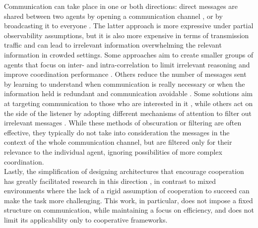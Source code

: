 \documentclass[a4paper,singleside,12pt]{report} %
\begin{document}
Communication can take place in one or both directions: direct messages are shared between two agents by opening a communication channel \cite{Niu2021MultiAgentGC, Zhao2022TargetedMC}, or by broadcasting it to everyone \cite{Kim2021CommunicationIM, Lin2021LearningTG, Sukhbaatar2016LearningMC, Das2018TarMACTM}. The latter approach is more expressive under partial observability assumptions, but it is also more expensive in terms of transmission traffic and can lead to irrelevant information overwhelming the relevant information in crowded settings. Some approaches aim to create smaller groups of agents that focus on inter- and intra-correlation to limit irrelevant reasoning and improve coordination performance \cite{Liu2021LearningCF, Niu2021MultiAgentGC, Liu2020When2comMP, Niu2021MultiAgentGC, ATOCJiang2018LearningAC}. Others reduce the number of messages sent by learning to understand when communication is really necessary or when the information held is redundant and communication avoidable \cite{Liu2020When2comMP, Ding2020LearningII}. Some solutions aim at targeting communication to those who are interested in it \cite{Zhao2022TargetedMC}, while others act on the side of the listener by adopting different mechanisms of attention to filter out irrelevant messages \cite{Li2021LearningED, Kim2021CommunicationIM, Sukhbaatar2016LearningMC, Das2018TarMACTM}. While these methods of obscuration or filtering are often effective, they typically do not take into consideration the messages in the context of the whole communication channel, but are filtered only for their relevance to the individual agent, ignoring possibilities of more complex coordination.\\
Lastly, the simplification of designing architectures that encourage cooperation has greatly facilitated research in this direction \cite{Foerster2017CounterfactualMP, Li2021LearningED, Liu2021LearningCF, Mao2017ACCNetAN, Ding2020LearningII, Sukhbaatar2016LearningMC}, in contrast to mixed environments \cite{Tu2021AdversarialAO, Blumenkamp2020TheEO} where the lack of a rigid assumption of cooperation to succeed can make the task more challenging. This work, in particular, does not impose a fixed structure on communication, while maintaining a focus on efficiency, and does not limit its applicability only to cooperative frameworks.
\end{document}
